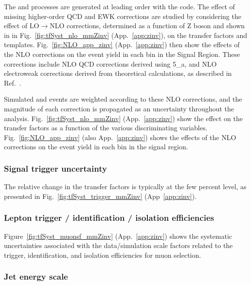 The \zmmj and \znunuj processes are generated at leading order with
the \MADGRAPH code. The effect of missing higher-order QCD and EWK
corrections are studied by considering the effect of
LO$\rightarrow$NLO corrections, determined as a function of Z boson
\Pt and shown in in Fig.~\ref{fig:tfSyst_nlo_mmZinv}
(App.~\ref{app:zinv}), on the transfer factors and \HTmiss templates.
Fig.~\ref{fig:NLO_app_zinv} (App.~\ref{app:zinv}) then show the
effects of the NLO corrections on the event yield in each bin in the
Signal Region.  These corrections include NLO QCD corrections derived
using {\MADGRAPH{}5\_a\MCATNLO}, and NLO electroweak corrections
derived from theoretical calculations, as described in
Ref.~\cite{monojet_AN_36fb}.

Simulated \zmmj and \znunuj events are weighted according to these NLO
corrections, and the magnitude of each correction is propagated as an
uncertainty throughout the analysis. Fig.~\ref{fig:tfSyst_nlo_mmZinv}
(App.~\ref{app:zinv}) show the effect on the transfer factors as a
function of the various discriminating variables. 
Fig.~\ref{fig:NLO_app_zinv} (also App.~\ref{app:zinv}) shows the
effects of the NLO corrections on the event yield in each bin in the
signal region.

\subsubsection{Signal trigger uncertainty}
\label{sec:tfSyst_trigger-zinv}

The relative change in the transfer factors is typically at the few
percent level, as presented in Fig.~\ref{fig:tfSyst_trigger_mmZinv}
(App~\ref{app:zinv}).

\subsubsection{Lepton trigger / identification / isolation efficiencies}
\label{sec:leptonSyst-zinv}

Figure~\ref{fig:tfSyst_muonsf_mmZinv} (App.~\ref{app:zinv}) shows the
systematic uncertainties associated with the data/simulation scale
factors related to the trigger, identification, and isolation
efficiencies for muon selection.

\subsubsection{Jet energy scale}
\label{sec:tfSyst_jec-zinv}

